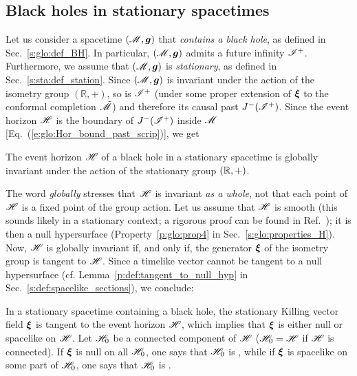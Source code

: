\subsection{Black holes in stationary spacetimes}
\label{s:sta:BH_stationary}

Let us consider a spacetime $(\mathscr{M},\bm{g})$ that \emph{contains a black hole}, as defined in
Sec.~\ref{s:glo:def_BH}. In particular, $(\mathscr{M},\bm{g})$ admits a future
infinity $\mathscr{I}^+$.
Furthermore, we assume that $(\mathscr{M},\bm{g})$ is \emph{stationary},
as defined in Sec.~\ref{s:sta:def_station}.
Since $(\mathscr{M},\bm{g})$ is invariant under the action of the isometry group $(\mathbb{R},+)$,
so is $\mathscr{I}^+$ (under some proper extension of $\bm{\xi}$ to the conformal
completion $\tilde{\mathscr{M}}$)
and therefore its causal past $J^-(\mathscr{I}^+)$. Since the event horizon $\mathscr{H}$
is the boundary of $J^-(\mathscr{I}^+)$
inside $\mathscr{M}$ [Eq.~(\ref{e:glo:Hor_bound_past_scrip})], we get

\begin{prop}
\label{p:sta:stationary_hor}
The event horizon $\mathscr{H}$ of a black hole in a stationary spacetime
is globally invariant under the action of the stationary group $(\mathbb{R},+)$.
\end{prop}

The word \emph{globally} stresses that
$\mathscr{H}$ is invariant \emph{as a whole}, not that
each point of $\mathscr{H}$ is a fixed point of the group action.
Let us assume that $\mathscr{H}$ is smooth (this sounds likely in a stationary context;
a rigorous proof can be found in Ref.~\cite{ChrusDGH01});
it is then a null hypersurface (Property~\ref{p:glo:prop4} in Sec.~\ref{s:glo:properties_H}).
Now, $\mathscr{H}$ is globally invariant if, and only if, the
generator $\bm{\xi}$ of the isometry group is tangent to $\mathscr{H}$.
Since a timelike vector cannot be tangent to a null hypersurface (cf.
Lemma~\ref{p:def:tangent_to_null_hyp} in Sec.~\ref{s:def:spacelike_sections}), we conclude:

\begin{prop}
\label{p:sta:xi_tangent_H}
In a stationary spacetime containing a black hole,
the stationary Killing vector field  $\bm{\xi}$ is tangent to the event horizon
$\mathscr{H}$, which implies that $\bm{\xi}$ is either null or spacelike on $\mathscr{H}$.
Let $\mathscr{H}_0$ be a connected component of $\mathscr{H}$
($\mathscr{H}_0 = \mathscr{H}$ if $\mathscr{H}$ is connected).
If $\bm{\xi}$ is null on all $\mathscr{H}_0$, one says that $\mathscr{H}_0$
is , while if $\bm{\xi}$ is
spacelike on some part of $\mathscr{H}_0$, one says that $\mathscr{H}_0$ is
.
\end{prop}

